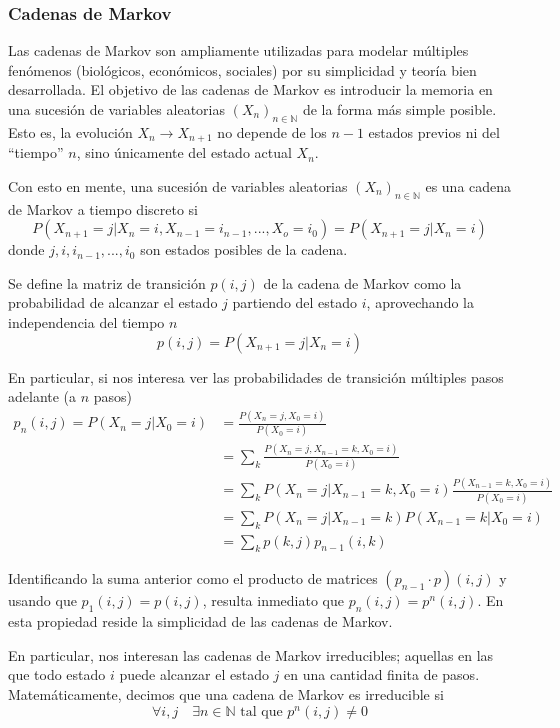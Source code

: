 \subsubsection{Cadenas de Markov}

Las cadenas de Markov son ampliamente utilizadas para modelar múltiples fenómenos (biológicos, económicos, sociales) por su simplicidad y teoría bien desarrollada\cite[pp. 1]{BOOK:DURRET}.
El objetivo de las cadenas de Markov es introducir la memoria en una sucesión de variables aleatorias $(X_n)_{n\in \mathbb{N}}$ de la forma más simple posible.
Esto es, la evolución $X_n \to X_{n+1}$ no depende de los $n-1$ estados previos ni del ``tiempo'' $n$, sino únicamente del estado actual $X_n$.

Con esto en mente, una sucesión de variables aleatorias $(X_n)_{n\in \mathbb{N}}$ es una cadena de Markov a tiempo discreto si
\[ P(X_{n+1}=j | X_n = i, X_{n-1} = i_{n-1}, ..., X_o = i_0) = P(X_{n+1}=j | X_n = i)  \]
donde $j, i, i_{n-1}, ..., i_0$ son estados posibles de la cadena.

Se define la matriz de transición $p(i,j)$ de la cadena de Markov como la probabilidad de alcanzar el estado $j$ partiendo del estado $i$, aprovechando la independencia del tiempo $n$
\[ p(i,j) = P(X_{n+1} = j | X_n = i) \]

En particular, si nos interesa ver las probabilidades de transición múltiples pasos adelante (a $n$ pasos)
\begin{align*}
 p_n(i,j) = P(X_n = j | X_0 = i) &= \frac{P(X_n = j, X_0 = i)}{P(X_0 = i)} \\
 &= \sum_k \frac{P(X_n = j, X_{n-1}=k, X_0 = i)}{P(X_0 = i)} \\
 &= \sum_k P(X_n = j| X_{n-1}=k, X_0 = i)\frac{P(X_{n-1}=k, X_0 = i)}{P(X_0 = i)} \\
 &= \sum_k P(X_n = j| X_{n-1}=k)P(X_{n-1}=k| X_0 = i) \\
 &= \sum_k p(k,j)p_{n-1}(i,k)
\end{align*}

Identificando la suma anterior como el producto de matrices $(p_{n-1} \cdot p)(i,j)$ y usando que $p_1(i,j)=p(i,j)$, resulta inmediato que $p_n(i,j) = p^n(i,j)$.
En esta propiedad reside la simplicidad de las cadenas de Markov.

En particular, nos interesan las cadenas de Markov irreducibles; aquellas en las que todo estado $i$ puede alcanzar el estado $j$ en una cantidad finita de pasos.
Matemáticamente, decimos que una cadena de Markov es irreducible si
\[ \forall i,j \quad \exists n\in \mathbb{N} \text{ tal que } p^n(i,j) \neq 0 \]

